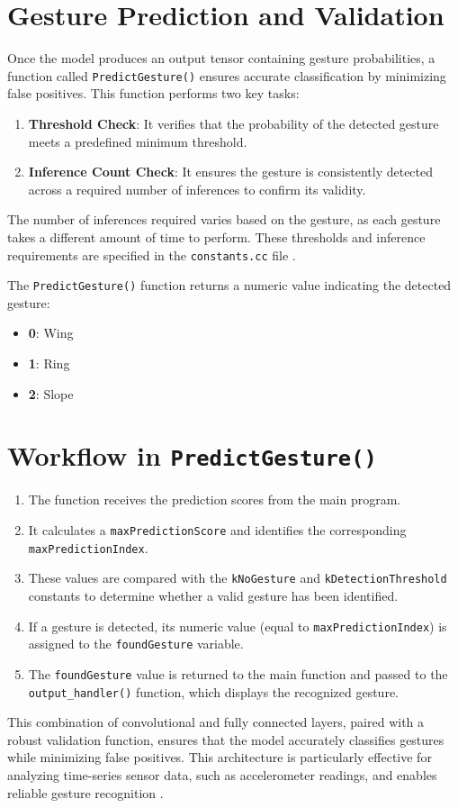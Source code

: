 \section*{Gesture Prediction and Validation}
Once the model produces an output tensor containing gesture probabilities, a function called \texttt{PredictGesture()} ensures accurate classification by minimizing false positives. This function performs two key tasks:
\begin{enumerate}
	\item \textbf{Threshold Check}: It verifies that the probability of the detected gesture meets a predefined minimum threshold.
	\item \textbf{Inference Count Check}: It ensures the gesture is consistently detected across a required number of inferences to confirm its validity.
\end{enumerate}

The number of inferences required varies based on the gesture, as each gesture takes a different amount of time to perform. These thresholds and inference requirements are specified in the \texttt{constants.cc} file \cite{Warden:2020}.

The \texttt{PredictGesture()} function returns a numeric value indicating the detected gesture:
\begin{itemize}
	\item \textbf{0}: Wing
	\item \textbf{1}: Ring
	\item \textbf{2}: Slope
\end{itemize}

\section*{Workflow in \texttt{PredictGesture()}}
\begin{enumerate}
	\item The function receives the prediction scores from the main program.
	\item It calculates a \texttt{maxPredictionScore} and identifies the corresponding \texttt{maxPredictionIndex}.
	\item These values are compared with the \texttt{kNoGesture} and \texttt{kDetectionThreshold} constants to determine whether a valid gesture has been identified.
	\item If a gesture is detected, its numeric value (equal to \texttt{maxPredictionIndex}) is assigned to the \texttt{foundGesture} variable.
	\item The \texttt{foundGesture} value is returned to the main function and passed to the \texttt{output\_handler()} function, which displays the recognized gesture.
\end{enumerate}

This combination of convolutional and fully connected layers, paired with a robust validation function, ensures that the model accurately classifies gestures while minimizing false positives. This architecture is particularly effective for analyzing time-series sensor data, such as accelerometer readings, and enables reliable gesture recognition \cite{Warden:2020}.
